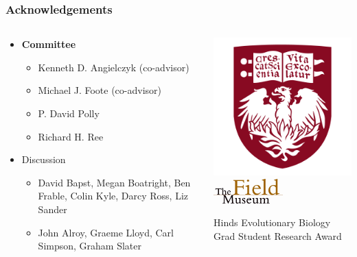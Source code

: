 \documentclass{beamer}
\begin{document}
\begin{frame}
  \frametitle{Acknowledgements}
  \begin{columns}
    \begin{column}{0.5\textwidth}
      \begin{itemize}
        \item \textbf{Committee}
          \begin{itemize}
            \item Kenneth D. Angielczyk (co-advisor)
            \item Michael J. Foote (co-advisor)
            \item P. David Polly
            \item Richard H. Ree
          \end{itemize}
        \item Discussion
          \begin{itemize}
            \item David Bapst, Megan Boatright, Ben Frable, Colin Kyle, Darcy Ross, Liz Sander
            \item John Alroy, Graeme Lloyd, Carl Simpson, Graham Slater
          \end{itemize}
      \end{itemize}
    \end{column}
    \begin{column}{0.5\textwidth}
      \includegraphics[height = 0.3\textheight, keepaspectratio = true]{figure/chicago} \\
      \includegraphics[height = 0.3\textheight, width = 0.5\textwidth, keepaspectratio = true]{figure/field} \\

      \vspace{0.5cm}

      \small{Hinds Evolutionary Biology \\Grad Student Research Award}
    \end{column}
  \end{columns}
\end{frame}
\end{document}
